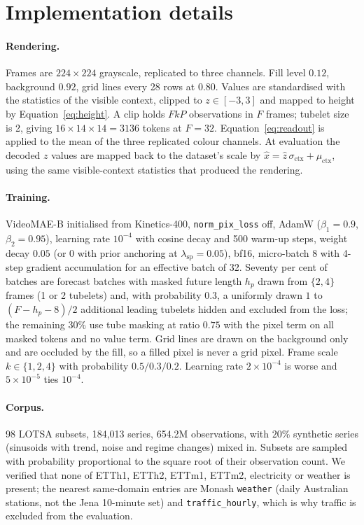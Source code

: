 \section{Implementation details}
\label{app:impl}

\paragraph{Rendering.} Frames are $224\times224$ grayscale, replicated to three channels. Fill level
$0.12$, background $0.92$, grid lines every 28 rows at $0.80$. Values are standardised with the
statistics of the visible context, clipped to $z\in[-3,3]$ and mapped to height by
Equation~\ref{eq:height}. A clip holds $FkP$ observations in $F$ frames; tubelet size is 2, giving
$16\times14\times14 = 3136$ tokens at $F=32$. Equation~\ref{eq:readout} is applied to the mean of the
three replicated colour channels. At evaluation the decoded $z$ values are mapped back to the
dataset's scale by $\hat{x} = \hat{z}\,\sigma_{\mathrm{ctx}} + \mu_{\mathrm{ctx}}$, using the same
visible-context statistics that produced the rendering.

\paragraph{Training.} VideoMAE-B initialised from Kinetics-400, \texttt{norm\_pix\_loss} off, AdamW
($\beta_1{=}0.9$, $\beta_2{=}0.95$), learning rate $10^{-4}$ with cosine decay and 500 warm-up
steps, weight decay $0.05$ (or $0$ with prior anchoring at $\lambda_{\mathrm{sp}}=0.05$), bf16,
micro-batch 8 with 4-step gradient accumulation for an effective batch of 32. Seventy per cent of batches are forecast batches with
masked future length $h_p$ drawn from $\{2,4\}$ frames (1 or 2 tubelets) and, with probability $0.3$, a
uniformly drawn $1$ to $(F-h_p-8)/2$ additional leading tubelets hidden and excluded from the loss;
the remaining $30\%$ use tube masking at ratio $0.75$ with the pixel term on all masked tokens and no
value term. Grid lines are drawn on the background only and are occluded by the fill, so a filled
pixel is never a grid pixel. Frame scale $k\in\{1,2,4\}$ with probability
$0.5/0.3/0.2$. Learning rate $2\times10^{-4}$ is worse and $5\times10^{-5}$ ties $10^{-4}$.

\paragraph{Corpus.} 98 LOTSA subsets, 184{,}013 series, 654.2M observations, with $20\%$ synthetic
series (sinusoids with trend, noise and regime changes) mixed in. Subsets are sampled with
probability proportional to the square root of their observation count. We verified that none of
ETTh1, ETTh2, ETTm1, ETTm2, electricity or weather is present; the nearest same-domain entries are
Monash \texttt{weather} (daily Australian stations, not the Jena 10-minute set) and
\texttt{traffic\_hourly}, which is why traffic is excluded from the evaluation.

